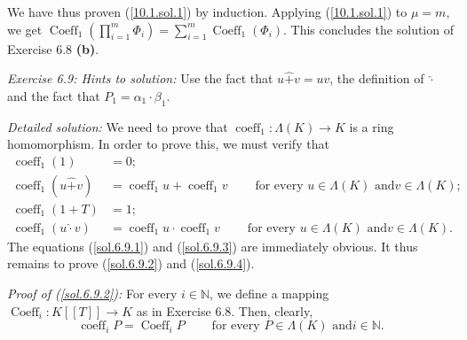 \documentclass[numbers=enddot,12pt,final,onecolumn,notitlepage]{scrartcl}%
\begin{document}
We have thus proven (\ref{10.1.sol.1}) by induction. Applying
(\ref{10.1.sol.1}) to $\mu=m$, we get $\operatorname*{Coeff}\nolimits_{1}%
\left(  \prod\limits_{i=1}^{m}\Phi_{i}\right)  =\sum\limits_{i=1}%
^{m}\operatorname*{Coeff}\nolimits_{1}\left(  \Phi_{i}\right)  $. This
concludes the solution of Exercise 6.8 \textbf{(b)}.

\textit{Exercise 6.9: Hints to solution:} Use the fact that $u\widehat{+}%
v=uv$, the definition of $\widehat{\cdot}$ and the fact that $P_{1}=\alpha
_{1}\cdot\beta_{1}$.

\textit{Detailed solution:} We need to prove that $\operatorname*{coeff}%
\nolimits_{1}:\Lambda\left(  K\right)  \rightarrow K$ is a ring homomorphism.
In order to prove this, we must verify that%
\begin{align}
\operatorname*{coeff}\nolimits_{1}\left(  1\right)   &  =0;\label{sol.6.9.1}\\
\operatorname*{coeff}\nolimits_{1}\left(  u\widehat{+}v\right)   &
=\operatorname*{coeff}\nolimits_{1}u+\operatorname*{coeff}\nolimits_{1}%
v\ \ \ \ \ \ \ \ \ \ \text{for every }u\in\Lambda\left(  K\right)  \text{ and
}v\in\Lambda\left(  K\right)  ;\label{sol.6.9.2}\\
\operatorname*{coeff}\nolimits_{1}\left(  1+T\right)   &  =1;
\label{sol.6.9.3}\\
\operatorname*{coeff}\nolimits_{1}\left(  u\widehat{\cdot}v\right)   &
=\operatorname*{coeff}\nolimits_{1}u\cdot\operatorname*{coeff}\nolimits_{1}%
v\ \ \ \ \ \ \ \ \ \ \text{for every }u\in\Lambda\left(  K\right)  \text{ and
}v\in\Lambda\left(  K\right)  . \label{sol.6.9.4}%
\end{align}
The equations (\ref{sol.6.9.1}) and (\ref{sol.6.9.3}) are immediately obvious.
It thus remains to prove (\ref{sol.6.9.2}) and (\ref{sol.6.9.4}).

\textit{Proof of (\ref{sol.6.9.2}):} For every $i\in\mathbb{N}$, we define a
mapping $\operatorname*{Coeff}\nolimits_{i}:K\left[  \left[  T\right]
\right]  \rightarrow K$ as in Exercise 6.8. Then, clearly,%
\begin{equation}
\operatorname*{coeff}\nolimits_{i}P=\operatorname*{Coeff}\nolimits_{i}%
P\ \ \ \ \ \ \ \ \ \ \text{for every }P\in\Lambda\left(  K\right)  \text{ and
}i\in\mathbb{N}. \label{sol.6.9.2.pf.1}%
\end{equation}
\end{document}
